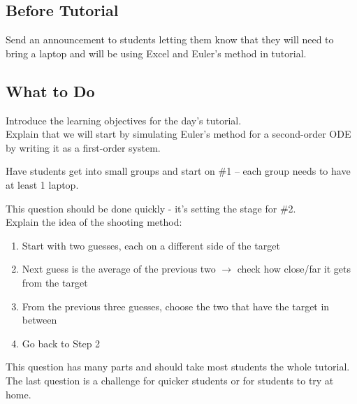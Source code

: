 \subsection*{Before Tutorial}

Send an announcement to students letting them know that they will need to bring a laptop and will be using Excel and Euler's method in tutorial.


\subsection*{What to Do}
	Introduce the learning objectives for the day's tutorial. \\
	
	Explain that we will start by simulating Euler's method for a second-order ODE by writing it as a first-order system.
	
	Have students get into small groups and start on \#1 -- each group needs to have at least 1 laptop. 
	
	This question should be done quickly - it's setting the stage for \#2. \\
	
	
	Explain the idea of the shooting method:
	\begin{enumerate}
		\item Start with two guesses, each on a different side of the target
		\item Next guess is the average of the previous two $\to$ check how close/far it gets from the target
		\item From the previous three guesses, choose the two that have the target in between
		\item Go back to Step 2
	\end{enumerate}
	
	This question has many parts and should take most students the whole tutorial. \\

	The last question is a challenge for quicker students or for students to try at home.
	


%
	
	

	
	
